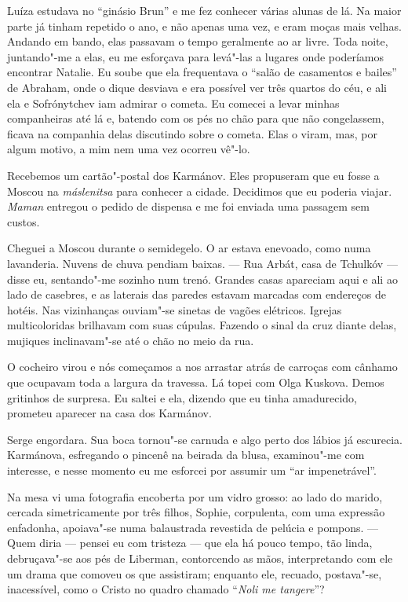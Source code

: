 Luíza estudava no ``ginásio Brun'' e me fez conhecer várias alunas de
lá. Na maior parte já tinham repetido o ano, e não apenas uma vez, e
eram moças mais velhas. Andando em bando, elas passavam o tempo
geralmente ao ar livre. Toda noite, juntando"-me a elas, eu me esforçava
para levá"-las a lugares onde poderíamos encontrar Natalie. Eu soube que
ela frequentava o ``salão de casamentos e bailes'' de Abraham, onde o
dique desviava e era possível ver três quartos do céu, e ali ela e
Sofrónytchev iam admirar o cometa. Eu comecei a levar minhas
companheiras até lá e, batendo com os pés no chão para que não
congelassem, ficava na companhia delas discutindo sobre o cometa. Elas o
viram, mas, por algum motivo, a mim nem uma vez ocorreu vê"-lo.

Recebemos um cartão"-postal dos Karmánov. Eles propuseram que eu fosse a
Moscou na \emph{máslenitsa} para conhecer a cidade. Decidimos que eu
poderia viajar. \emph{Maman} entregou o pedido de dispensa e me foi
enviada uma passagem sem custos.

Cheguei a Moscou durante o semidegelo. O ar estava enevoado, como numa
lavanderia. Nuvens de chuva pendiam baixas. --- Rua Arbát, casa de
Tchulkóv --- disse eu, sentando"-me sozinho num trenó. Grandes casas
apareciam aqui e ali ao lado de casebres, e as laterais das paredes
estavam marcadas com endereços de hotéis. Nas vizinhanças ouviam"-se
sinetas de vagões elétricos. Igrejas multicoloridas brilhavam com suas
cúpulas. Fazendo o sinal da cruz diante delas, mujiques inclinavam"-se
até o chão no meio da rua.

O cocheiro virou e nós começamos a nos arrastar atrás de carroças com
cânhamo que ocupavam toda a largura da travessa. Lá topei com Olga
Kuskova. Demos gritinhos de surpresa. Eu saltei e ela, dizendo que eu
tinha amadurecido, prometeu aparecer na casa dos Karmánov.

Serge engordara. Sua boca tornou"-se carnuda e algo perto dos lábios já
escurecia. Karmánova, esfregando o pincenê na beirada da blusa,
examinou"-me com interesse, e nesse momento eu me esforcei por assumir um
``ar impenetrável''.

Na mesa vi uma fotografia encoberta por um vidro grosso: ao lado do
marido, cercada simetricamente por três filhos, Sophie, corpulenta, com
uma expressão enfadonha, apoiava"-se numa balaustrada revestida de
pelúcia e pompons. --- Quem diria --- pensei eu com tristeza --- que ela
há pouco tempo, tão linda, debruçava"-se aos pés de Liberman, contorcendo
as mãos, interpretando com ele um drama que comoveu os que assistiram;
enquanto ele, recuado, postava"-se, inacessível, como o Cristo no quadro
chamado ``\emph{Noli me tangere}''?

